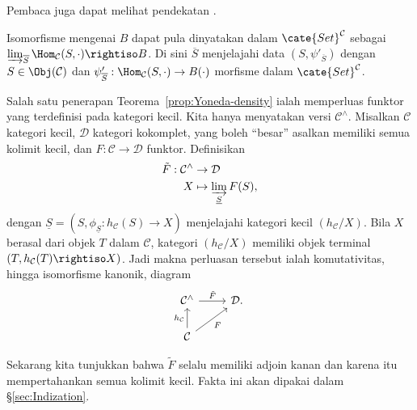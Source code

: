 Pembaca juga dapat melihat pendekatan \cite[hlm. 76--77]{ML98}.

\begin{remark}\label{rem:Yoneda-density}
	Isomorfisme mengenai $B$ dapat pula dinyatakan dalam
	$\cate{Set}^{\mathcal{C}}$ sebagai
	$\varinjlim_{\overline S}\Hom_{\mathcal{C}}(S,\mathord\cdot)
	\rightiso B$. Di sini $\overline S$ menjelajahi data
	$(S,\psi'_{\overline S})$ dengan $S\in\Obj(\mathcal{C})$ dan
	$\psi'_{\overline S}:\Hom_{\mathcal{C}}(S,\mathord\cdot)\to
	B(\mathord\cdot)$ morfisme dalam $\cate{Set}^{\mathcal{C}}$.
\end{remark}

Salah satu penerapan Teorema~\ref{prop:Yoneda-density} ialah memperluas
funktor yang terdefinisi pada kategori kecil. Kita hanya menyatakan versi
$\mathcal{C}^\wedge$. Misalkan $\mathcal{C}$ kategori kecil,
$\mathcal{D}$ kategori kokomplet, yang boleh ``besar'' asalkan memiliki
semua kolimit kecil, dan $F:\mathcal{C}\to\mathcal{D}$ funktor. Definisikan
\begin{equation}\label{eqn:Yoneda-F-tilde}\begin{aligned}
	\tilde{F}: \mathcal{C}^\wedge & \to \mathcal{D} \\
	X & \mapsto \varinjlim_{\underline{S}} F(S),
\end{aligned}\end{equation}
dengan
$\underline S=(S,\phi_{\underline S}:h_{\mathcal{C}}(S)\to X)$
menjelajahi kategori kecil $(h_{\mathcal{C}}/X)$. Bila $X$ berasal dari
objek $T$ dalam $\mathcal{C}$, kategori $(h_{\mathcal{C}}/X)$ memiliki
objek terminal $(T,h_{\mathcal{C}}(T)\rightiso X)$. Jadi makna perluasan
tersebut ialah komutativitas, hingga isomorfisme kanonik, diagram
\[\begin{tikzcd}
	\mathcal{C}^\wedge \arrow[r, "{\tilde{F}}"] & \mathcal{D}. \\
	\mathcal{C} \arrow[u, "{h_{\mathcal{C}}}"] \arrow[ru, "F"'] &
\end{tikzcd}\]

Sekarang kita tunjukkan bahwa $\tilde F$ selalu memiliki adjoin kanan dan
karena itu mempertahankan semua kolimit kecil. Fakta ini akan dipakai dalam
\S\ref{sec:Indization}.

